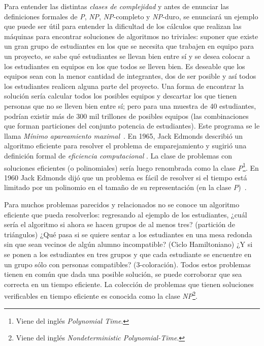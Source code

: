 Para entender las distintas \textit{clases de complejidad} y antes de enunciar
las definiciones formales de \textsl{P}, \textsl{NP}, \textsl{NP}-completo y
\textsl{NP}-duro, se enunciará un ejemplo que puede ser útil para entender la
dificultad de los cálculos que realizan las máquinas para encontrar soluciones
de algoritmos no triviales: suponer que existe un gran grupo de estudiantes
en los que se necesita que trabajen en equipo para un proyecto, se sabe qué
estudiantes se llevan bien entre sí y se desea colocar a los estudiantes en
equipos en los que todos se lleven bien. Es deseable que los equipos sean con la menor cantidad de
integrantes, dos de ser posible y así todos los estudiantes realicen alguna
parte del proyecto. Una forma de encontrar la solución sería calcular todos los
posibles equipos y descartar los que tienen personas que no se lleven 
bien entre sí; pero para una muestra de 40 estudiantes, podrían existir más de
300 mil trillones de posibles equipos (las combinaciones que forman particiones
del conjunto potencia de estudiantes). Este programa se le llama \textit{Mínimo
  apareamiento maximal}~\cite{10.1007/978-3-540-79228-4_32}.  En 1965, Jack
Edmonds describió un algoritmo eficiente para resolver el problema de
emparejamiento y sugirió una definición formal de \textit{eficiencia
  computacional} \cite{Mathematics}. La clase de problemas con soluciones
eficientes (o polinomiales) sería luego renombrada como la clase \textsl{P}\footnote{Viene del
  inglés \textit{Polynomial Time}.}. En 1960 Jack Edmonds dijó que un problema es fácil 
  de resolver si el tiempo está limitado por un polinomio en el tamaño de su representación 
  (en la clase \textsl{P})~\cite{Schrijverpolyhedralcombinatorics}.

Para muchos problemas parecidos y relacionados no se conoce un algoritmo
eficiente que pueda resolverlos: regresando al ejemplo de los estudiantes, ¿cuál
sería el algoritmo si ahora se hacen grupos de al menos tres? (partición de triángulos)
¿Qué pasa si se quiere sentar a los estudiantes en una mesa redonda sin que sean
vecinos de algún alumno incompatible? (Ciclo Hamiltoniano) ¿Y si se ponen a los
estudiantes en tres grupos y que cada estudiante se encuentre en un grupo sólo
con personas compatibles? (3-coloración).  Todos estos problemas tienen en común
que dada una posible solución, se puede corroborar que sea correcta en un tiempo
eficiente.  La colección de problemas que tienen soluciones verificables en
tiempo eficiente es conocida como la clase \textsl{NP}\footnote{Viene del inglés
  \textit{ Nondeterministic Polynomial-Time}.}.

